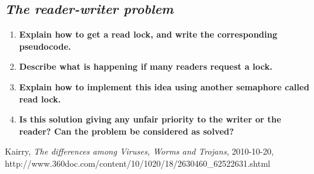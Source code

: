 \documentclass{article}
\begin{document}
\begin{spacing}{1.5}
\section{\textit{The reader-writer problem}}
\begin{enumerate}
	\item\textbf{Explain how to get a read lock, and write the corresponding pseudocode.}\\
	
	\item\textbf{Describe what is happening if many readers request a lock.}\\

	\item\textbf{Explain how to implement this idea using another semaphore called read lock.
}\\

	\item\textbf{Is this solution giving any unfair priority to the writer or the reader? Can the problem be considered as solved?}

\end{enumerate}
\begin{thebibliography}{0}
Kairry, \textit{The differences among Viruses, Worms and Trojans}, 2010-10-20, http://www.360doc.com/content/10/1020/18/2630460\_62522631.shtml
\end{thebibliography}
\end{spacing}
\end{document}
